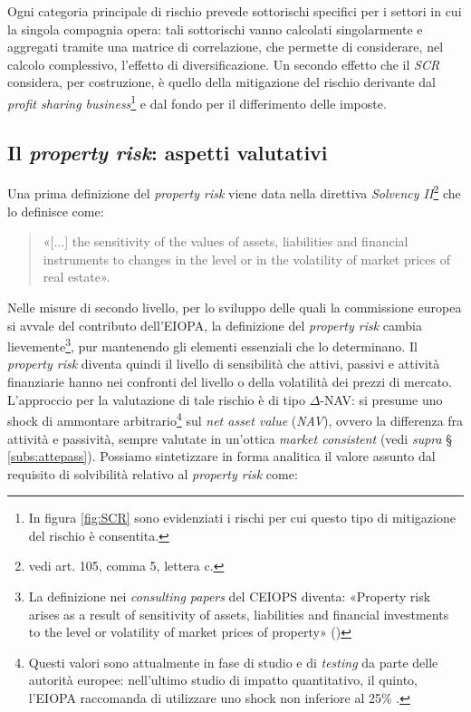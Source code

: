 Ogni categoria principale di rischio prevede sottorischi specifici per i settori in cui la singola compagnia opera: tali sottorischi vanno calcolati singolarmente e aggregati tramite una matrice di correlazione, che permette di considerare, nel calcolo complessivo, l'effetto di diversificazione. Un secondo effetto che il {\itshape SCR} considera, per costruzione, è quello della mitigazione del rischio derivante dal {\itshape profit sharing business}\footnote{In figura  \ref{fig:SCR} sono evidenziati i rischi per cui questo tipo di mitigazione del rischio è consentita.} e dal fondo per il differimento delle imposte.

\subsection{Il {\itshape property risk}: aspetti valutativi}
\label{subs:propertyrisk}
Una prima definizione del {\itshape property risk} viene data nella direttiva {\itshape Solvency II}\footnote{vedi art. 105, comma 5, lettera c.} che lo definisce come:
\begin{quotation} «[...] the sensitivity of the values of assets, liabilities and financial instruments to changes in the level or in the volatility of market prices of real estate».
\end{quotation}
Nelle misure di secondo livello, per lo sviluppo delle quali la commissione europea si avvale del contributo dell'EIOPA, la definizione del {\itshape property risk} cambia lievemente\footnote{La definizione nei {\itshape consulting papers} del CEIOPS diventa: «Property risk arises as a result of sensitivity of assets, liabilities and financial investments to the level or volatility of market prices of property» (\cite[p. 23]{eiopal2standardformula})}, pur mantenendo gli elementi essenziali che lo determinano.
Il {\itshape property risk} diventa quindi il livello di sensibilità che attivi, passivi e attività finanziarie hanno nei confronti del livello o della volatilità dei prezzi di mercato. L'approccio per la valutazione di tale rischio è di tipo $\Delta$-NAV: si presume uno shock di ammontare arbitrario\footnote{Questi valori sono attualmente in fase di studio e di \textit{testing} da parte delle autorità europee: nell'ultimo studio di impatto quantitativo, il quinto, l'EIOPA raccomanda di utilizzare uno shock non inferiore al 25\% \cite{eiopaqis5calibration}.} sul {\itshape net asset value} ({\itshape NAV}), ovvero la differenza fra attività e passività, sempre valutate in un'ottica {\itshape market consistent} (vedi \textit{supra} § \ref{subs:attepass}).
Possiamo sintetizzare in forma analitica il valore assunto dal requisito di solvibilità relativo al {\itshape property risk} come:


